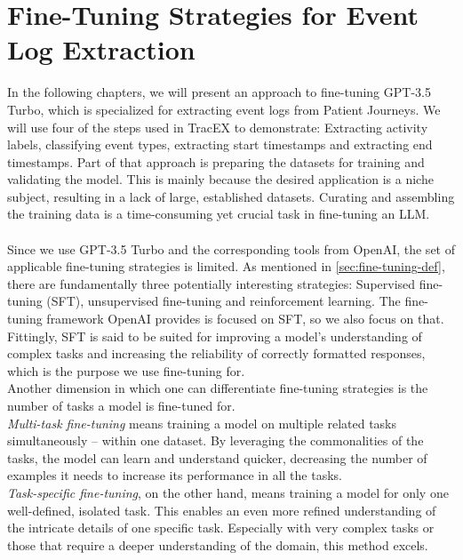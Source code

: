 \section{Fine-Tuning Strategies for Event Log Extraction}\label{sec:fine}
In the following chapters, we will present an approach to fine-tuning GPT-3.5 Turbo, which is specialized for extracting event logs from Patient Journeys. We will use four of the steps used in TracEX to demonstrate: Extracting activity labels, classifying event types, extracting start timestamps and extracting end timestamps. Part of that approach is preparing the datasets for training and validating the model. This is mainly because the desired application is a niche subject, resulting in a lack of large, established datasets. Curating and assembling the training data is a time-consuming yet crucial task in fine-tuning an LLM.\\\\
Since we use GPT-3.5 Turbo and the corresponding tools from OpenAI, the set of applicable fine-tuning strategies is limited. As mentioned in \autoref{sec:fine-tuning-def}, there are fundamentally three potentially interesting strategies: Supervised fine-tuning (SFT), unsupervised fine-tuning and reinforcement learning. The fine-tuning framework OpenAI provides is focused on SFT, so we also focus on that. Fittingly, SFT is said to be suited for improving a model's understanding of complex tasks and increasing the reliability of correctly formatted responses, which is the purpose we use fine-tuning for.\\
Another dimension in which one can differentiate fine-tuning strategies is the number of tasks a model is fine-tuned for.\\
\emph{Multi-task fine-tuning} means training a model on multiple related tasks simultaneously – within one dataset. By leveraging the commonalities of the tasks, the model can learn and understand quicker, decreasing the number of examples it needs to increase its performance in all the tasks.~\cite{pilault_conditionally_2020}\\
\emph{Task-specific fine-tuning}, on the other hand, means training a model for only one well-defined, isolated task. This enables an even more refined understanding of the intricate details of one specific task. Especially with very complex tasks or those that require a deeper understanding of the domain, this method excels.~\cite{xinxi_single_2021}\\\\
